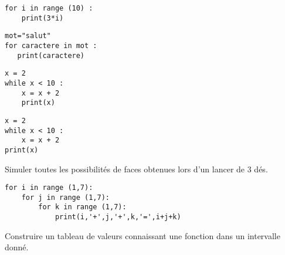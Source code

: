 \begin{minipage}{0.25\linewidth}
\begin{Cod}
\begin{lstlisting}
for i in range (10) : 
    print(3*i)
\end{lstlisting}
\end{Cod}
\end{minipage}
\begin{minipage}{0.28\linewidth}
\begin{Cod}
\begin{lstlisting}
mot="salut"
for caractere in mot : 
   print(caractere)
\end{lstlisting}
\end{Cod}
\end{minipage}
\begin{minipage}{0.25\linewidth}
\begin{Cod}
\begin{lstlisting}
x = 2 
while x < 10 : 
	x = x + 2
	print(x)
\end{lstlisting}
\end{Cod}
\end{minipage}
\begin{minipage}{0.25\linewidth}
\begin{Cod}
\begin{lstlisting}
x = 2
while x < 10 :
	x = x + 2
print(x)
\end{lstlisting}
\end{Cod}
\end{minipage}
 
 
 
 
 
 
 
 

\begin{ExC}{Simuler toutes les possibilités de faces obtenues lors d'un lancer de 3 dés.}
 
\begin{lstlisting}
for i in range (1,7):
    for j in range (1,7):
        for k in range (1,7):
            print(i,'+',j,'+',k,'=',i+j+k)
\end{lstlisting}                
\end{ExC}     
    

 



\begin{ExD}

Construire un tableau de valeurs connaissant une fonction dans un intervalle donné.
\end{ExD}

